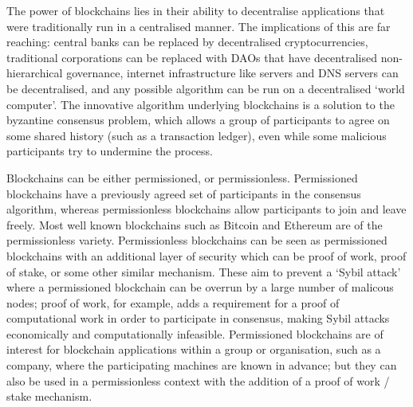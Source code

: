 

The power of blockchains lies in their ability to decentralise applications that were traditionally run in a centralised manner. The implications of this are far reaching: central banks can be replaced by decentralised cryptocurrencies, traditional corporations can be replaced with DAOs that have decentralised non-hierarchical governance, internet infrastructure like servers and DNS servers can be decentralised, and any possible algorithm can be run on a decentralised `world computer'. The innovative algorithm underlying blockchains is a solution to the byzantine consensus problem, which allows a group of participants to agree on some shared history (such as a transaction ledger), even while some malicious participants try to undermine the process.

Blockchains can be either permissioned, or permissionless. Permissioned blockchains have a previously agreed set of participants in the consensus algorithm, whereas permissionless blockchains allow participants to join and leave freely. Most well known blockchains such as Bitcoin and Ethereum are of the permissionless variety. Permissionless blockchains can be seen as permissioned blockchains with an additional layer of security which can be proof of work, proof of stake, or some other similar mechanism. These aim to prevent a `Sybil attack' where a permissioned blockchain can be overrun by a large number of malicous nodes; proof of work, for example, adds a requirement for a proof of computational work in order to participate in consensus, making Sybil attacks economically and computationally infeasible. Permissioned blockchains are of interest for blockchain applications within a group or organisation, such as a company, where the participating machines are known in advance; but they can also be used in a permissionless context with the addition of a proof of work / stake mechanism.


